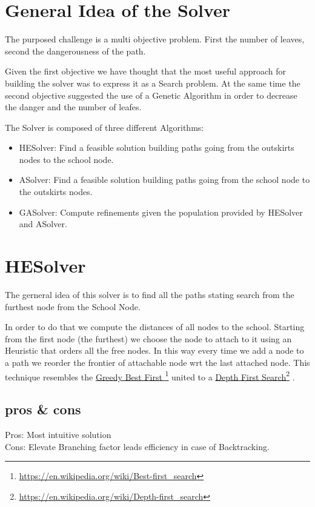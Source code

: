 \documentclass[english]{report}
\newcommand\fnurl[2]{%
	\href{#2}{#1}\footnote{\url{#2}}%
}
\begin{document}
\section{General Idea of the Solver}
The purposed challenge is a multi objective problem. First the number of leaves, second the dangerousness of the path.
\par Given the first objective we have thought that the most useful approach for building the solver was to express it as  a  Search problem.
At the same time the second objective suggested the use of a Genetic Algorithm in order to decrease the danger and the number of leafes.
\par The Solver is composed of three different Algorithms:
\begin{itemize}
	\item HESolver: Find a feasible solution building paths going from the outskirts nodes to the school node.
	\item ASolver: Find a feasible solution building paths going from the school node to the outskirts nodes.
	\item GASolver: Compute refinements given the population provided by HESolver and ASolver.
\end{itemize}

\section{HESolver}
The gerneral idea of this solver is to find all the paths stating search from the furthest node from the School Node.
\par In order to do that we compute the distances of all nodes to the school. Starting from the first node (the furthest) we choose the node to attach to it using an Heuristic that orders all the free nodes.
In this way every time we add a node to a path we reorder the frontier of attachable node wrt the last attached node. This technique resembles the \fnurl{Greedy Best First }{https://en.wikipedia.org/wiki/Best-first_search} united to a \fnurl{Depth First Search}{https://en.wikipedia.org/wiki/Depth-first_search}.

\subsection*{pros \& cons}
Pros: Most intuitive solution\\
Cons: Elevate Branching factor leads efficiency in case of Backtracking.
\end{document}

